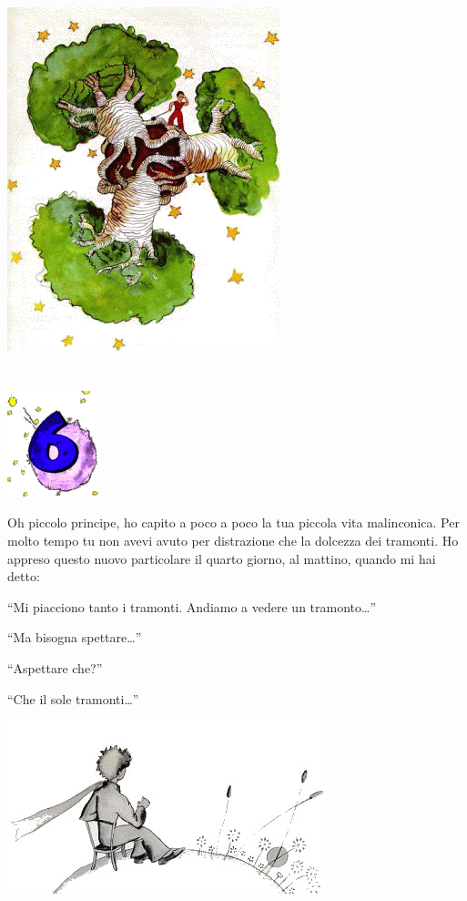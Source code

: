 \documentclass[11pt]{scrbook}
\begin{document}
\begin{center}
\includegraphics{img/baobaby}
\end{center}

\chapter{}
\begin{center}
\includegraphics{img/chapter6}
\end{center}

Oh piccolo principe, ho capito a poco a poco la tua piccola vita
malinconica. Per molto tempo tu non avevi avuto per distrazione che la
dolcezza dei tramonti. Ho appreso questo nuovo particolare il quarto
giorno, al mattino, quando mi hai detto:

``Mi piacciono tanto i tramonti. Andiamo a vedere un tramonto\ldots{}''

``Ma bisogna spettare\ldots{}''

``Aspettare che?''

``Che il sole tramonti\ldots{}''

\begin{center}
\includegraphics{img/6a}
\end{center}
\end{document}
